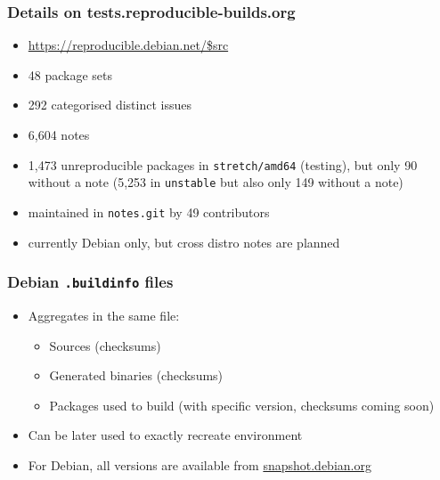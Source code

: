 \documentclass[14pt]{beamer}
\begin{document}
\begin{frame}
 \frametitle{Details on tests.reproducible-builds.org}

 \begin{itemize}
  \item \url{https://reproducible.debian.net/$src}
  \item 48 package sets 
  \item 292 categorised distinct issues
  \item 6,604 notes
  \item 1,473 unreproducible packages in \texttt{stretch/amd64} (testing), but only
  90 without a note (5,253 in \texttt{unstable} but also only 149 without a
  note)
  \item maintained in \texttt{notes.git} by 49 contributors
  \item currently Debian only, but cross distro notes are planned
 \end{itemize}
\end{frame}


\begin{frame}
 \frametitle{Debian \texttt{.buildinfo} files}

 \begin{itemize}
  \item Aggregates in the same file:
   \begin{itemize}
    \item Sources (checksums)
    \item Generated binaries (checksums)
    \item Packages used to build (with specific version, checksums coming soon)
   \end{itemize}
  \item Can be later used to exactly recreate environment
  \item For Debian, all versions are available from \url{snapshot.debian.org}
 \end{itemize}
\end{frame}
\end{document}
